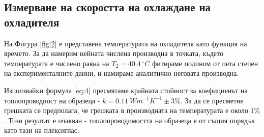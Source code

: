 \documentclass[reprint,amsmath,amssymb,aps,floatfix]{revtex4-2}
\newcommand{\degree}{^{\circ}}
\begin{document}
\subsection{Измерване на скоростта на охлаждане на охладителя}

На Фигура \ref{fig:2} е представена температурата на охладителя като функция на времето. За да намерим нейната числена производна в точката, където температурата е числено равна на $T_2 = 40.4 \ \degree C$ фитираме полином от пета степен на експерименталните данни, и намираме аналитично неговата производна.  


Използвайки формула \eqref{eq:4} пресмятаме крайната стойност за коефициенът на топлопроводност на образеца - $k = 0.11 \ \si{Wm^{-1}K^{-1}} \pm 3\%$.  За да се пресметне грешката се предполага, че грешката в производната на температурата е около $1\%$. Този резултат е очакван - топлопроводимостта на образеца е от същия порядък като тази на плексиглас. 
\end{document}
